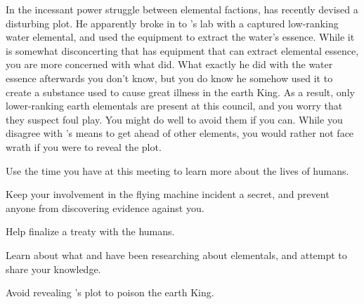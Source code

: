 \documentclass[char]{elementals}
\begin{document}
In the incessant power struggle between elemental factions, \cKing{} has recently devised a disturbing plot.  He apparently broke in to \cGD{}'s lab with a captured low-ranking water elemental, and used the equipment to extract the water's essence.  While it is somewhat disconcerting that \cGD{} has equipment that can extract elemental essence, you are more concerned with what \cKing{} did.  What exactly he did with the water essence afterwards you don't know, but you do know he somehow used it to create a substance used to cause great illness in the earth King.  As a result, only lower-ranking earth elementals are present at this council, and you worry that they suspect foul play.  You might do well to avoid them if you can.  While you disagree with \cKing{}'s means to get ahead of other elements, you would rather not face \cKing{\their} wrath if you were to reveal the plot.

\begin{itemz}[Goals]
  \item Use the time you have at this meeting to learn more about the lives of humans.
  \item Keep your involvement in the flying machine incident a secret, and prevent anyone from discovering evidence against you.
  \item Help \cKing{} finalize a treaty with the humans.
  \item Learn about what \cGD{} and \cScientist{} have been researching about elementals, and attempt to share your knowledge.  
  \item Avoid revealing \cKing{}'s plot to poison the earth King.
\end{itemz}
\end{document}
